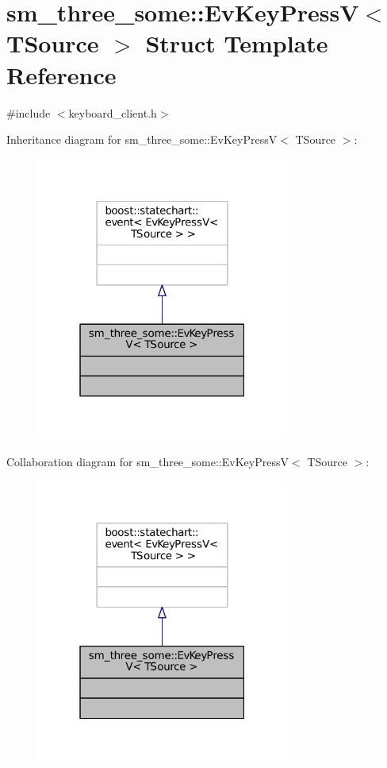 \hypertarget{structsm__three__some_1_1EvKeyPressV}{}\section{sm\+\_\+three\+\_\+some\+:\+:Ev\+Key\+PressV$<$ T\+Source $>$ Struct Template Reference}
\label{structsm__three__some_1_1EvKeyPressV}


{\ttfamily \#include $<$keyboard\+\_\+client.\+h$>$}



Inheritance diagram for sm\+\_\+three\+\_\+some\+:\+:Ev\+Key\+PressV$<$ T\+Source $>$\+:
\nopagebreak
\begin{figure}[H]
\begin{center}
\leavevmode
\includegraphics[width=235pt]{structsm__three__some_1_1EvKeyPressV__inherit__graph}
\end{center}
\end{figure}


Collaboration diagram for sm\+\_\+three\+\_\+some\+:\+:Ev\+Key\+PressV$<$ T\+Source $>$\+:
\nopagebreak
\begin{figure}[H]
\begin{center}
\leavevmode
\includegraphics[width=235pt]{structsm__three__some_1_1EvKeyPressV__coll__graph}
\end{center}
\end{figure}


